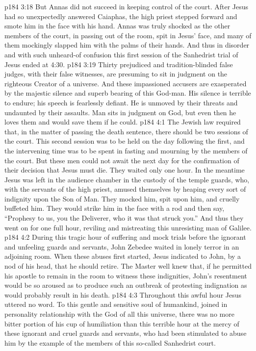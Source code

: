 \vs p184 3:18 But Annas did not succeed in keeping control of the court. After Jesus had so unexpectedly answered Caiaphas, the high priest stepped forward and smote him in the face with his hand. Annas was truly shocked as the other members of the court, in passing out of the room, spit in Jesus’ face, and many of them mockingly slapped him with the palms of their hands. And thus in disorder and with such unheard\hyp{}of confusion this first session of the Sanhedrist trial of Jesus ended at 4:30.
\vs p184 3:19 \pc Thirty prejudiced and tradition\hyp{}blinded false judges, with their false witnesses, are presuming to sit in judgment on the righteous Creator of a universe. And these impassioned accusers are exasperated by the majestic silence and superb bearing of this God\hyp{}man. His silence is terrible to endure; his speech is fearlessly defiant. He is unmoved by their threats and undaunted by their assaults. Man sits in judgment on God, but even then he loves them and would save them if he could.
\vs p184 4:1 The Jewish law required that, in the matter of passing the death sentence, there should be two sessions of the court. This second session was to be held on the day following the first, and the intervening time was to be spent in fasting and mourning by the members of the court. But these men could not await the next day for the confirmation of their decision that Jesus must die. They waited only one hour. In the meantime Jesus was left in the audience chamber in the custody of the temple guards, who, with the servants of the high priest, amused themselves by heaping every sort of indignity upon the Son of Man. They mocked him, spit upon him, and cruelly buffeted him. They would strike him in the face with a rod and then say, “Prophesy to us, you the Deliverer, who it was that struck you.” And thus they went on for one full hour, reviling and mistreating this unresisting man of Galilee.
\vs p184 4:2 During this tragic hour of suffering and mock trials before the ignorant and unfeeling guards and servants, John Zebedee waited in lonely terror in an adjoining room. When these abuses first started, Jesus indicated to John, by a nod of his head, that he should retire. The Master well knew that, if he permitted his apostle to remain in the room to witness these indignities, John’s resentment would be so aroused as to produce such an outbreak of protesting indignation as would probably result in his death.
\vs p184 4:3 Throughout this awful hour Jesus uttered no word. To this gentle and sensitive soul of humankind, joined in personality relationship with the God of all this universe, there was no more bitter portion of his cup of humiliation than this terrible hour at the mercy of these ignorant and cruel guards and servants, who had been stimulated to abuse him by the example of the members of this so\hyp{}called Sanhedrist court.
